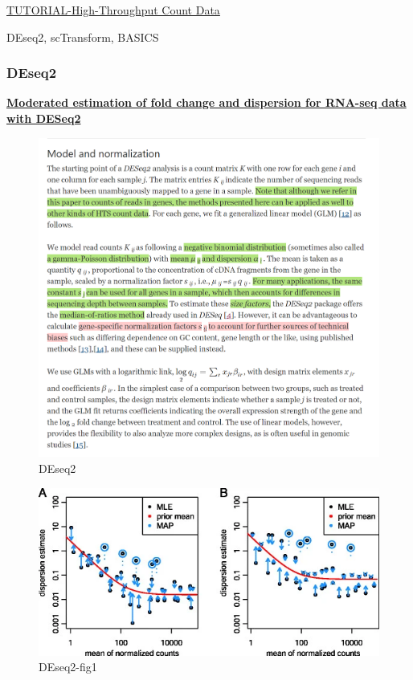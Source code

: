 \documentclass[
]{book}
\begin{document}
\href{http://web.stanford.edu/class/bios221/book/Chap-CountData.html}{TUTORIAL-High-Throughput Count Data}

DEseq2, scTransform, BASICS

\hypertarget{deseq2}{%
\subsubsection{DEseq2}\label{deseq2}}

\textbf{\href{https://genomebiology.biomedcentral.com/articles/10.1186/s13059-014-0550-8}{Moderated estimation of fold change and dispersion for RNA-seq data with DESeq2}\citep{love2014moderated}}

\begin{figure}
\centering
\includegraphics{./figs/RNAseqCounts/DEseq2.png}
\caption{DEseq2}
\end{figure}

\begin{figure}
\centering
\includegraphics{./figs/RNAseqCounts/DEseq2_Fig1.png}
\caption{DEseq2-fig1}
\end{figure}
\end{document}
